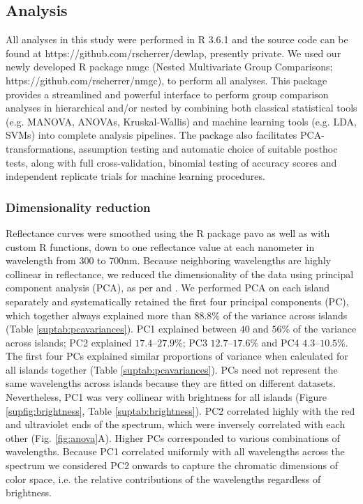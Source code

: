 \subsection*{Analysis}

All analyses in this study were performed in R 3.6.1 \citep{RCoreTeam2019} and the source code can be found at https://github.com/rscherrer/dewlap, presently private. We used our newly developed R package nmgc (Nested Multivariate Group Comparisons; https://github.com/rscherrer/nmgc), to perform all analyses. This package provides a streamlined and powerful interface to perform group comparison analyses in hierarchical and/or nested by combining both classical statistical tools (e.g. MANOVA, ANOVAs, Kruskal-Wallis) and machine learning tools (e.g. LDA, SVMs) into complete analysis pipelines. The package also facilitates PCA-transformations, assumption testing and automatic choice of suitable posthoc tests, along with full cross-validation, binomial testing of accuracy scores and independent replicate trials for machine learning procedures.

\subsubsection*{Dimensionality reduction}

Reflectance curves were smoothed using the R package pavo \citep{Maia2013} as well as with custom R functions, down to one reflectance value at each nanometer in wavelength from 300 to 700nm. Because neighboring wavelengths are highly collinear in reflectance, we reduced the dimensionality of the data using principal component analysis (PCA), as per \citet{Cuthill1999} and \citet{Leal2002}. We performed PCA on each island separately and systematically retained the first four principal components (PC), which together always explained more than $88.8\%$ of the variance across islands (Table \ref{suptab:pcavariances}). PC1 explained between $40$ and $56$\% of the variance across islands; PC2 explained $17.4$--$27.9$\%; PC3 $12.7$--$17.6$\% and PC4 $4.3$--$10.5$\%. The first four PCs explained similar proportions of variance when calculated for all islands together (Table \ref{suptab:pcavariances}). PCs need not represent the same wavelengths across islands because they are fitted on different datasets. Nevertheless, PC1 was very collinear with brightness for all islands (Figure \ref{supfig:brightness}, Table \ref{suptab:brightness}). PC2 correlated highly with the red and ultraviolet ends of the spectrum, which were inversely correlated with each other (Fig. \ref{fig:anova}A). Higher PCs corresponded to various combinations of wavelengths. Because PC1 correlated uniformly with all wavelengths across the spectrum  we considered PC2 onwards to capture the chromatic dimensions of color space, i.e. the relative contributions of the wavelengths regardless of brightness.

